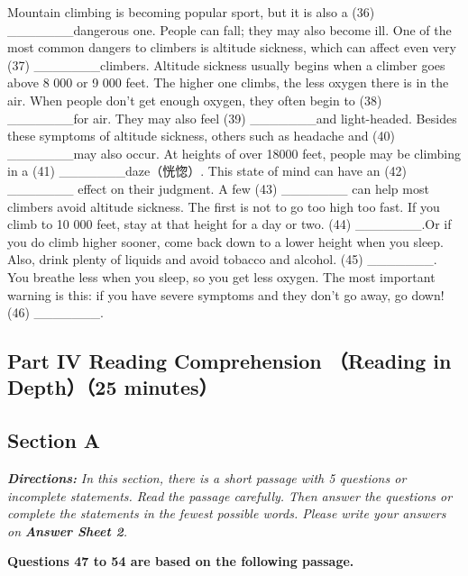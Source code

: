 \documentclass[UTF8,11pt]{ctexart}
\begin{document}
Mountain climbing is becoming popular sport, but it is also a (36) \_\_\_\_\_\_\_dangerous one. People can fall; they may also become ill. One of the most common dangers to climbers is altitude sickness, which can affect even very (37) \_\_\_\_\_\_\_climbers. Altitude sickness usually begins when a climber goes above 8 000 or 9 000 feet. The higher one climbs, the less oxygen there is in the air. When people don't get enough oxygen, they often begin to (38) \_\_\_\_\_\_\_for air. They may also feel (39) \_\_\_\_\_\_\_and light-headed. Besides these symptoms of altitude sickness, others such as headache and (40) \_\_\_\_\_\_\_may also occur. At heights of over 18000 feet, people may be climbing in a (41) \_\_\_\_\_\_\_daze（恍惚）. This state of mind can have an (42) \_\_\_\_\_\_\_ effect on their judgment. A few (43) \_\_\_\_\_\_\_ can help most climbers avoid altitude sickness. The first is not to go too high too fast. If you climb to 10 000 feet, stay at that height for a day or two. (44) \_\_\_\_\_\_\_.Or if you do climb higher sooner, come back down to a lower height when you sleep. Also, drink plenty of liquids and avoid tobacco and alcohol. (45) \_\_\_\_\_\_\_. You breathe less when you sleep, so you get less oxygen. The most important warning is this: if you have severe symptoms and they don't go away, go down! (46) \_\_\_\_\_\_\_.


\subsection*{\textbf{Part} IV \textbf{Reading Comprehension} （\textbf{Reading in Depth}）（\textbf{25 minutes}）}


\subsection*{\textbf{Section A}}


\textbf{\textit{Directions:}}\textit{ In this section, there is a short passage with 5 questions or incomplete statements. Read} \textit{the passage carefully. Then answer the questions or complete the statements in the} \textit{fewest possible words. Please write your answers on}\textbf{\textit{ Answer Sheet 2}}\textit{.}


\textbf{Questions 47 to 54 are based on the following passage.}
\end{document}
